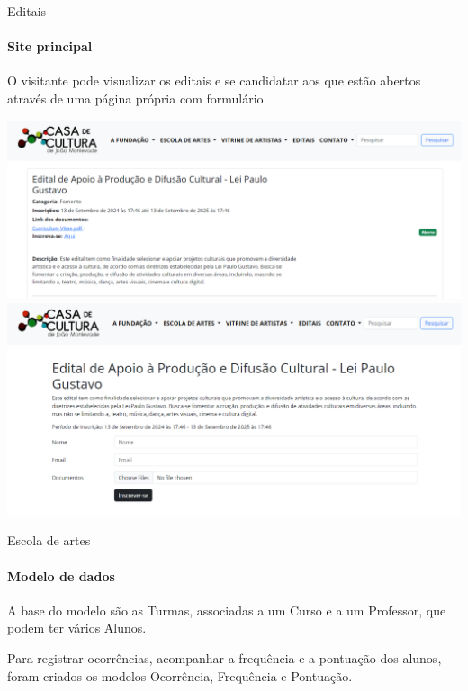 \begin{frame}{Editais}
\framesubtitle{Site principal}
    O visitante pode visualizar os editais e se candidatar aos que estão abertos através de uma página própria com formulário.
    
    \vspace{\baselineskip}
    
        \begin{center}
            \includegraphics[scale=0.18]{beamerthemesrc/assets/lista_editais.png}
            \includegraphics[scale=0.15]{beamerthemesrc/assets/form_edital.png}
        \end{center}
\end{frame}


\begin{frame}{Escola de artes}
\framesubtitle{Modelo de dados}

    A base do modelo são as Turmas, associadas a um Curso e a um Professor, que podem ter vários Alunos.
    
    \vspace{\baselineskip}
    
    Para registrar ocorrências, acompanhar a frequência e a pontuação dos alunos,
    foram criados os modelos Ocorrência, Frequência e Pontuação.
    
\end{frame}
    
